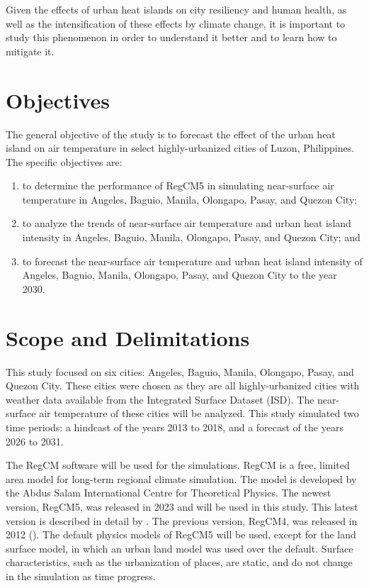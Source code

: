 	Given the effects of urban heat islands on city resiliency and human health,
		as well as the intensification of these effects by climate change,
		it is important to study this phenomenon in order to understand it better and to learn how to mitigate it.

\section{Objectives}
	The general objective of the study is to forecast the effect of the urban heat island on air temperature in select highly-urbanized cities of Luzon, Philippines.
	The specific objectives are:
	\begin{enumerate}
		\item to determine the performance of RegCM5 in simulating near-surface air temperature in Angeles, Baguio, Manila, Olongapo, Pasay, and Quezon City;
		\item to analyze the trends of near-surface air temperature and urban heat island intensity in Angeles, Baguio, Manila, Olongapo, Pasay, and Quezon City; and
		\item to forecast the near-surface air temperature and urban heat island intensity of Angeles, Baguio, Manila, Olongapo, Pasay, and Quezon City to the year 2030.
	\end{enumerate}
	

\section{Scope and Delimitations}
	This study focused on six cities: Angeles, Baguio, Manila, Olongapo, Pasay, and Quezon City.
	These cities were chosen as they are all highly-urbanized cities with weather data available from the Integrated Surface Dataset (ISD).
	The near-surface air temperature of these cities will be analyzed.
	This study simulated two time periods: 
		a hindcast of the years 2013 to 2018, 
		and a forecast of the years 2026 to 2031.

	The RegCM software will be used for the simulations.
	RegCM is a free, limited area model for long-term regional climate simulation.
	The model is developed by the Abdus Salam International Centre for Theoretical Physics.
	The newest version, RegCM5, was released in 2023 and will be used in this study.
	This latest version is described in detail by \textcite{Giorgi2023}. 
	The previous version, RegCM4, was released in 2012 (\textcite{Giorgi2012}).
	The default physics models of RegCM5 will be used, except for the land surface model, in which an urban land model was used over the default.
	Surface characteristics, such as the urbanization of places, are static, and do not change in the simulation as time progress. 
